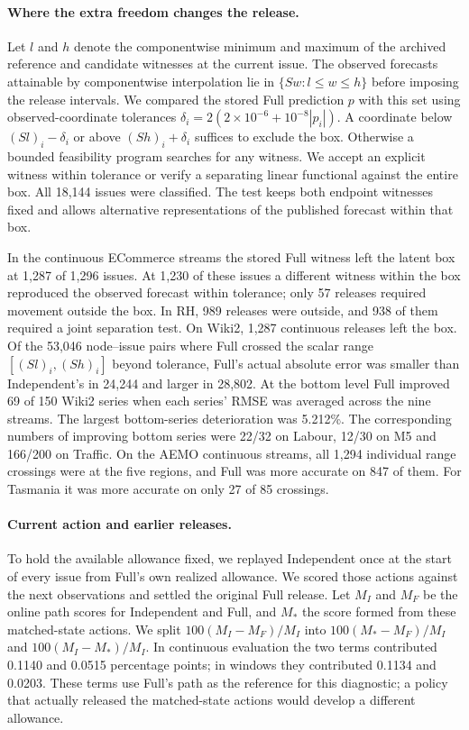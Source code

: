 \paragraph{Where the extra freedom changes the release.}
Let $l$ and $h$ denote the componentwise minimum and maximum of the archived reference and candidate witnesses at the current issue. The observed forecasts attainable by componentwise interpolation lie in $\{Sw:l\le w\le h\}$ before imposing the release intervals. We compared the stored Full prediction $p$ with this set using observed-coordinate tolerances $\delta_i=2(2\times10^{-6}+10^{-8}|p_i|)$. A coordinate below $(Sl)_i-\delta_i$ or above $(Sh)_i+\delta_i$ suffices to exclude the box. Otherwise a bounded feasibility program searches for any witness. We accept an explicit witness within tolerance or verify a separating linear functional against the entire box. All 18,144 issues were classified. The test keeps both endpoint witnesses fixed and allows alternative representations of the published forecast within that box.

In the continuous ECommerce streams the stored Full witness left the latent box at 1,287 of 1,296 issues. At 1,230 of these issues a different witness within the box reproduced the observed forecast within tolerance; only 57 releases required movement outside the box. In RH, 989 releases were outside, and 938 of them required a joint separation test. On Wiki2, 1,287 continuous releases left the box. Of the 53,046 node--issue pairs where Full crossed the scalar range $[(Sl)_i,(Sh)_i]$ beyond tolerance, Full's actual absolute error was smaller than Independent's in 24,244 and larger in 28,802. At the bottom level Full improved 69 of 150 Wiki2 series when each series' RMSE was averaged across the nine streams. The largest bottom-series deterioration was 5.212\%. The corresponding numbers of improving bottom series were 22/32 on Labour, 12/30 on M5 and 166/200 on Traffic. On the AEMO continuous streams, all 1,294 individual range crossings were at the five regions, and Full was more accurate on 847 of them. For Tasmania it was more accurate on only 27 of 85 crossings.

\paragraph{Current action and earlier releases.}
To hold the available allowance fixed, we replayed Independent once at the start of every issue from Full's own realized allowance. We scored those actions against the next observations and settled the original Full release. Let $M_I$ and $M_F$ be the online path scores for Independent and Full, and $M_*$ the score formed from these matched-state actions. We split $100(M_I-M_F)/M_I$ into $100(M_*-M_F)/M_I$ and $100(M_I-M_*)/M_I$. In continuous evaluation the two terms contributed 0.1140 and 0.0515 percentage points; in windows they contributed 0.1134 and 0.0203. These terms use Full's path as the reference for this diagnostic; a policy that actually released the matched-state actions would develop a different allowance.

